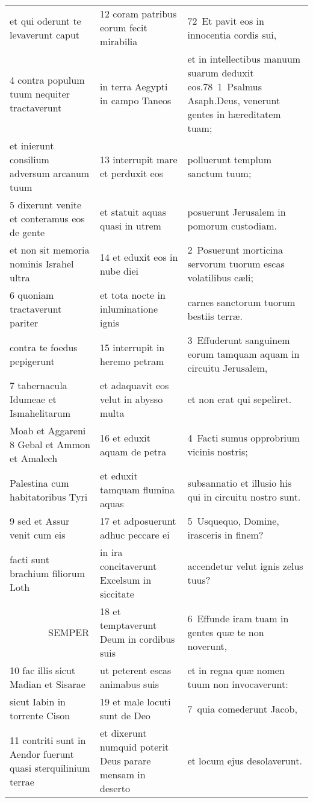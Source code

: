 \documentclass{article}
\begin{document}
\begin{longtable}{@{}p{}p{}p{}@{}}
et qui oderunt te levaverunt caput	&	12 coram patribus eorum fecit mirabilia	&	72 Et pavit eos in innocentia cordis sui,	\\
4 contra populum tuum nequiter tractaverunt	&	in terra Aegypti in campo Taneos	&	et in intellectibus manuum suarum deduxit eos.78 1 Psalmus Asaph.Deus, venerunt gentes in hæreditatem tuam;	\\
et inierunt consilium adversum arcanum tuum	&	13 interrupit mare et perduxit eos	&	polluerunt templum sanctum tuum;	\\
5 dixerunt venite et conteramus eos de gente	&	et statuit aquas quasi in utrem	&	posuerunt Jerusalem in pomorum custodiam.	\\
et non sit memoria nominis Israhel ultra	&	14 et eduxit eos in nube diei	&	2 Posuerunt morticina servorum tuorum escas volatilibus cæli;	\\
6 quoniam tractaverunt pariter	&	et tota nocte in inluminatione ignis	&	carnes sanctorum tuorum bestiis terræ.	\\
contra te foedus pepigerunt	&	15 interrupit in heremo petram	&	3 Effuderunt sanguinem eorum tamquam aquam in circuitu Jerusalem,	\\
7 tabernacula Idumeae et Ismahelitarum	&	et adaquavit eos velut in abysso multa	&	et non erat qui sepeliret.	\\
Moab et Aggareni 8 Gebal et Ammon et Amalech	&	16 et eduxit aquam de petra	&	4 Facti sumus opprobrium vicinis nostris;	\\
Palestina cum habitatoribus Tyri	&	et eduxit tamquam flumina aquas	&	subsannatio et illusio his qui in circuitu nostro sunt.	\\
9 sed et Assur venit cum eis	&	17 et adposuerunt adhuc peccare ei	&	5 Usquequo, Domine, irasceris in finem?	\\
facti sunt brachium filiorum Loth	&	in ira concitaverunt Excelsum in siccitate	&	accendetur velut ignis zelus tuus?	\\
    SEMPER	&	18 et temptaverunt Deum in cordibus suis	&	6 Effunde iram tuam in gentes quæ te non noverunt,	\\
10 fac illis sicut Madian et Sisarae	&	ut peterent escas animabus suis	&	et in regna quæ nomen tuum non invocaverunt:	\\
sicut Iabin in torrente Cison	&	19 et male locuti sunt de Deo	&	7 quia comederunt Jacob,	\\
11 contriti sunt in Aendor fuerunt quasi sterquilinium terrae	&	et dixerunt numquid poterit Deus parare mensam in deserto	&	et locum ejus desolaverunt.	\\

\end{longtable}
\end{document}
